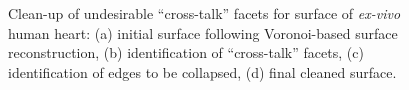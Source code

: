 \begin{figure}[ht]
{\label{fig:cross2-4}}		
%
\caption{Clean-up of undesirable ``cross-talk'' facets for surface of \textit{ex-vivo} human heart: (a) initial surface following Voronoi-based surface reconstruction, (b) identification of ``cross-talk'' facets, (c) identification of edges to be collapsed, (d) final cleaned surface.}
\label{fig:cross2}
\end{figure}

\begin{figure}[ht!]
\centering
{}
\subfigure[]{%
}
\end{figure}
